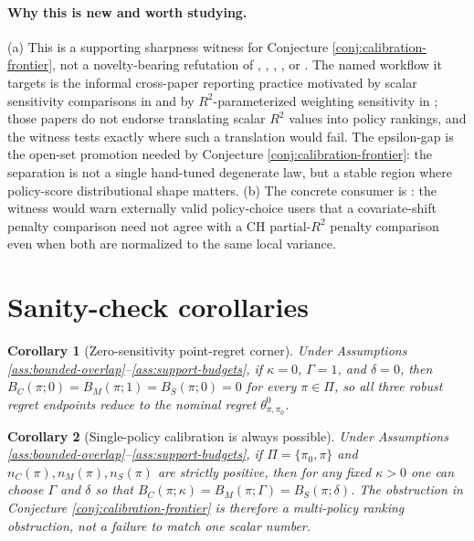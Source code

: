 \documentclass[11pt]{article}
\theoremstyle{definition}
\theoremstyle{plain}
\newtheorem{corollary}{Corollary}
\theoremstyle{remark}
\begin{document}
\paragraph{Why this is new and worth studying.}
(a) This is a supporting sharpness witness for Conjecture \ref{conj:calibration-frontier}, not a novelty-bearing refutation of \citet{CinelliHazlett2020}, \citet{SorianoBenMichaelBickelFellerPimentel2023}, \citet{HuangPimentel2025}, \citet{JinXuZhengZhou2025}, or \citet{AdjahoChristensen2025}.  The named workflow it targets is the informal cross-paper reporting practice motivated by scalar sensitivity comparisons in \citet{DiegertMastenPoirier2025} and by $R^2$-parameterized weighting sensitivity in \citet{HuangPimentel2025}; those papers do not endorse translating scalar $R^2$ values into policy rankings, and the witness tests exactly where such a translation would fail.  The epsilon-gap is the open-set promotion needed by Conjecture \ref{conj:calibration-frontier}: the separation is not a single hand-tuned degenerate law, but a stable region where policy-score distributional shape matters.  (b) The concrete consumer is \citet{AdjahoChristensen2025}: the witness would warn externally valid policy-choice users that a covariate-shift penalty comparison need not agree with a CH partial-$R^2$ penalty comparison even when both are normalized to the same local variance.

\section{Sanity-check corollaries}
\begin{corollary}[Zero-sensitivity point-regret corner]\label{cor:zero}
Under Assumptions \ref{ass:bounded-overlap}--\ref{ass:support-budgets}, if $\kappa=0$, $\Gamma=1$, and $\delta=0$, then $B_C(\pi;0)=B_M(\pi;1)=B_S(\pi;0)=0$ for every $\pi\in\Pi$, so all three robust regret endpoints reduce to the nominal regret $\theta^0_{\pi,\pi_0}$.
\end{corollary}

\begin{corollary}[Single-policy calibration is always possible]\label{cor:single-policy}
Under Assumptions \ref{ass:bounded-overlap}--\ref{ass:support-budgets}, if $\Pi=\{\pi_0,\pi\}$ and $n_C(\pi),n_M(\pi),n_S(\pi)$ are strictly positive, then for any fixed $\kappa>0$ one can choose $\Gamma$ and $\delta$ so that $B_C(\pi;\kappa)=B_M(\pi;\Gamma)=B_S(\pi;\delta)$.  The obstruction in Conjecture \ref{conj:calibration-frontier} is therefore a multi-policy ranking obstruction, not a failure to match one scalar number.
\end{corollary}
\end{document}
